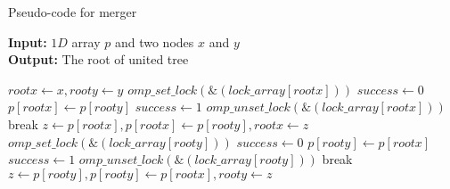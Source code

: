 \begin{algorithm}[ht]
\small
{
	\caption{Pseudo-code for merger}
	\label{alg:merger}
	\textbf{Input:} $1D$ array $p$ and two nodes $x$ and $y$ \\
	\textbf{Output:} The root of united tree 
	\begin{algorithmic}[1]
		\State $rootx \gets x, rooty \gets y$
					\State $omp\_set\_lock(\&(lock\_array[rootx]))$
					\State $success \gets 0$
						\State $p[rootx] \gets p[rooty]$
						\State $success \gets 1$
					\EndIf
					\State $omp\_unset\_lock(\&(lock\_array[rootx]))$
						\State break
					\EndIf
				\EndIf
				\State $z \gets p[rootx], p[rootx] \gets p[rooty], rootx \gets z$
			\Else
					\State $omp\_set\_lock(\&(lock\_array[rooty]))$
					\State $success \gets 0$
						\State $p[rooty] \gets p[rootx]$
						\State $success \gets 1$
					\EndIf
					\State $omp\_unset\_lock(\&(lock\_array[rooty]))$
						\State break
					\EndIf
				\EndIf
				\State $z \gets p[rooty], p[rooty] \gets p[rootx], rooty \gets z$
			\EndIf
		\EndWhile
		\State {}
	\EndFunction
	\end{algorithmic}	
}
\end{algorithm}
